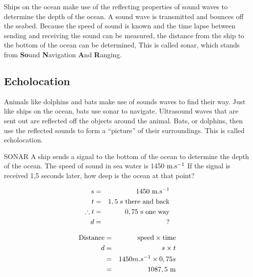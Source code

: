 Ships on the ocean make use of the reflecting properties of sound waves to determine the depth of the ocean. A sound wave is transmitted and bounces off the seabed. Because the speed of sound is known and the time lapse between sending and receiving the sound can be measured, the distance from the ship to the bottom of the ocean can be determined, This is called sonar, which stands from \textbf{So}und \textbf{N}avigation \textbf{A}nd \textbf{R}anging.

\subsection{Echolocation}
Animals like dolphins and bats make use of sounds waves to find their way. Just like ships on the ocean, bats use sonar to navigate. Ultrasound waves that are sent out are reflected off the objects around the animal. Bats, or dolphins, then use the reflected sounds to form a ``picture'' of their surroundings. This is called echolocation.

\begin{wex}{SONAR}
{A ship sends a signal to the bottom of the ocean to determine the depth of the ocean. The speed of sound in sea water is 1450 $\rm{m.s^{-1}}$ If the signal is received 1,5 seconds later, how deep is the ocean at that point?}
{
\begin{eqnarray*}
  s &=& 1450 \ \rm{m.s^{-1}}\\
  t &=& 1,5 \ \rm{s} \ \rm{there \ and \ back}\\
  \therefore t &= & 0,75 \ \rm{s} \ \rm{one \ way}\\
  d &=& ?
\end{eqnarray*}

\begin{eqnarray*}
  \rm{Distance} &=& \rm{speed} \times \rm{time} \\
  d &=& s \times t \\
  &=& 1450 m.s^{-1} \times 0,75 s \\
  &=& 1087,5 \ \rm{m}
\end{eqnarray*}
}
\end{wex}

